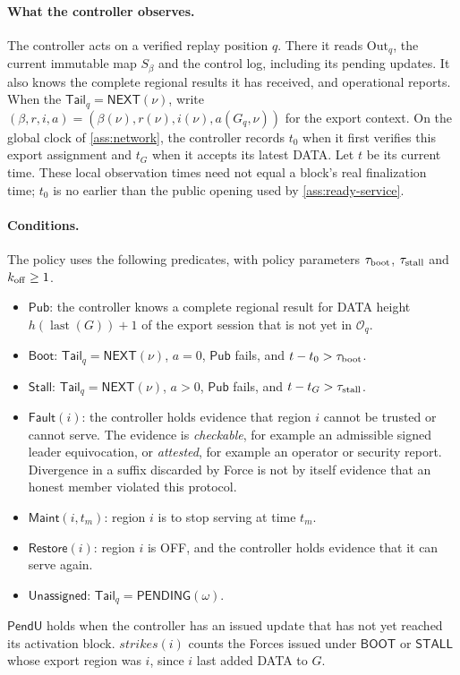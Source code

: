 \documentclass[11pt,a4paper]{article}
\newcommand{\tagg}[1]{\ensuremath{\mathsf{#1}}}
\newcounter{protocol}
\begin{document}
\paragraph{What the controller observes.}
The controller acts on a verified replay position $q$. There it reads
$\mathrm{Out}_q$, the current immutable map $S_\beta$ and the
control log, including its pending updates. It also knows the complete
regional results it has received, and operational reports. When the
$\mathsf{Tail}_q=\tagg{NEXT}(\nu)$, write
$(\beta,r,i,a)=(\beta(\nu),r(\nu),i(\nu),a(G_q,\nu))$
for the export context. On the global clock of \cref{ass:network},
the controller records $t_0$ when it first verifies this export
assignment and $t_G$ when it accepts its latest DATA. Let $t$ be its
current time. These local observation times need not equal a block's
real finalization time; $t_0$ is no earlier than the public opening used
by \cref{ass:ready-service}.

\paragraph{Conditions.}
The policy uses the following predicates, with policy parameters
$\tau_{\rm boot}$, $\tau_{\rm stall}$ and $k_{\rm off}\ge1$.
\begin{itemize}
\item $\tagg{Pub}$: the controller knows a complete regional result for
DATA height $h(\operatorname{last}(G))+1$ of the export session that is
not yet in $\mathcal O_q$.
\item $\tagg{Boot}$: $\mathsf{Tail}_q=\tagg{NEXT}(\nu)$, $a=0$, $\tagg{Pub}$ fails,
and $t-t_0>\tau_{\rm boot}$.
\item $\tagg{Stall}$: $\mathsf{Tail}_q=\tagg{NEXT}(\nu)$, $a>0$, $\tagg{Pub}$ fails,
and $t-t_G>\tau_{\rm stall}$.
\item $\tagg{Fault}(i)$: the controller holds evidence that region $i$
cannot be trusted or cannot serve. The evidence is \emph{checkable}, for
example an admissible signed leader equivocation, or
\emph{attested}, for example an operator or security report. Divergence
in a suffix discarded by Force is not by itself evidence that an honest
member violated this protocol.
\item $\tagg{Maint}(i,t_m)$: region $i$ is to stop serving at time $t_m$.
\item $\tagg{Restore}(i)$: region $i$ is OFF, and the controller holds
evidence that it can serve again.
\item $\tagg{Unassigned}$: $\mathsf{Tail}_q=\tagg{PENDING}(\omega)$.
\end{itemize}
$\tagg{PendU}$ holds when the controller has an issued update that has
not yet reached its activation block. $\mathit{strikes}(i)$ counts the
Forces issued under \tagg{BOOT} or \tagg{STALL} whose export region was
$i$, since $i$ last added DATA to $G$.
\end{document}

